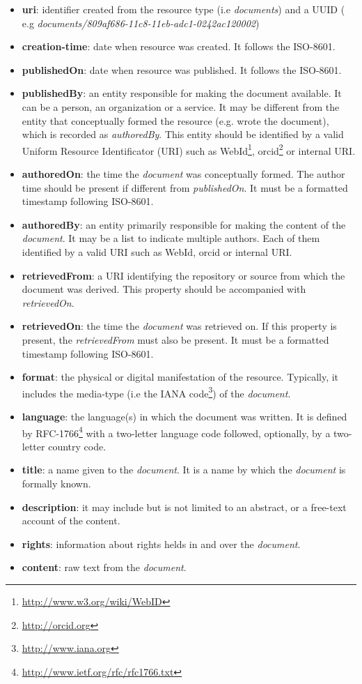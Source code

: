 \begin{itemize}
\item \textbf{uri}: identifier created from the resource type (i.e \textit{documents}) and a UUID ( e.g \textit{documents/809af686-11c8-11eb-adc1-0242ac120002})
\item \textbf{creation-time}: date when resource was created. It follows the ISO-8601.
\item \textbf{publishedOn}: date when resource was published. It follows the ISO-8601.
\item \textbf{publishedBy}: an entity responsible for making the document available. It can be a  person, an  organization or a service. It may be different from the entity that conceptually formed the resource (e.g. wrote the document), which is recorded as \textit{authoredBy}. This entity should be identified by a valid Uniform Resource  Identificator (URI) such as WebId\footnote{\url{http://www.w3.org/wiki/WebID}}, orcid\footnote{\url{http://orcid.org}} or internal URI. 
\item \textbf{authoredOn}: the time the \textit{document} was conceptually formed. The author time should be present if different from \textit{publishedOn}. It must be a formatted timestamp following ISO-8601.
\item \textbf{authoredBy}: an entity primarily responsible for making the content of the \textit{document}. It may be a list to indicate multiple authors. Each of them identified by a valid URI such as WebId, orcid or internal URI.
\item \textbf{retrievedFrom}: a URI identifying the repository or source from which the document was derived. This property should be accompanied with \textit{retrievedOn}.
\item \textbf{retrievedOn}: the time the \textit{document} was retrieved on. If this property is present, the \textit{retrievedFrom} must also be present. It must be a formatted timestamp following ISO-8601.
\item \textbf{format}: the physical or digital manifestation of the resource. Typically, it includes the media-type (i.e the IANA code\footnote{\url{http://www.iana.org}}) of the \textit{document}.
\item \textbf{language}: the language(s) in which the document was written. It is defined by RFC-1766\footnote{\url{http://www.ietf.org/rfc/rfc1766.txt}} with a two-letter language code followed, optionally, by a two-letter country code.
\item \textbf{title}: a name given to the \textit{document}. It is a name by which the \textit{document} is formally known.
\item \textbf{description}: it may include but is not limited to an abstract, or a free-text account of the content.
\item \textbf{rights}: information about rights helds in and over the \textit{document}.
\item \textbf{content}: raw text from the \textit{document}.
\end{itemize}

